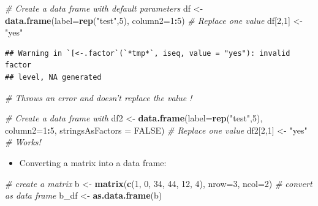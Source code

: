 \documentclass[]{book}
\newenvironment{Shaded}{\begin{snugshade}}{\end{snugshade}}
\newcommand{\CommentTok}[1]{\textcolor[rgb]{0.56,0.35,0.01}{\textit{#1}}}
\newcommand{\DataTypeTok}[1]{\textcolor[rgb]{0.13,0.29,0.53}{#1}}
\newcommand{\DecValTok}[1]{\textcolor[rgb]{0.00,0.00,0.81}{#1}}
\newcommand{\KeywordTok}[1]{\textcolor[rgb]{0.13,0.29,0.53}{\textbf{#1}}}
\newcommand{\NormalTok}[1]{#1}
\newcommand{\OperatorTok}[1]{\textcolor[rgb]{0.81,0.36,0.00}{\textbf{#1}}}
\newcommand{\OtherTok}[1]{\textcolor[rgb]{0.56,0.35,0.01}{#1}}
\newcommand{\StringTok}[1]{\textcolor[rgb]{0.31,0.60,0.02}{#1}}
\providecommand{\tightlist}{%
  \setlength{\itemsep}{0pt}\setlength{\parskip}{0pt}}
\begin{document}
\begin{Shaded}
\begin{Highlighting}[]
\CommentTok{# Create a data frame with default parameters}
\NormalTok{df <-}\StringTok{ }\KeywordTok{data.frame}\NormalTok{(}\DataTypeTok{label=}\KeywordTok{rep}\NormalTok{(}\StringTok{"test"}\NormalTok{,}\DecValTok{5}\NormalTok{), }\DataTypeTok{column2=}\DecValTok{1}\OperatorTok{:}\DecValTok{5}\NormalTok{)}
\CommentTok{# Replace one value}
\NormalTok{df[}\DecValTok{2}\NormalTok{,}\DecValTok{1}\NormalTok{] <-}\StringTok{ "yes"}
\end{Highlighting}
\end{Shaded}

\begin{verbatim}
## Warning in `[<-.factor`(`*tmp*`, iseq, value = "yes"): invalid factor
## level, NA generated
\end{verbatim}

\begin{Shaded}
\begin{Highlighting}[]
\CommentTok{# Throws an error and doesn't replace the value !}
\end{Highlighting}
\end{Shaded}

\begin{Shaded}
\begin{Highlighting}[]
\CommentTok{# Create a data frame with }
\NormalTok{df2 <-}\StringTok{ }\KeywordTok{data.frame}\NormalTok{(}\DataTypeTok{label=}\KeywordTok{rep}\NormalTok{(}\StringTok{"test"}\NormalTok{,}\DecValTok{5}\NormalTok{), }\DataTypeTok{column2=}\DecValTok{1}\OperatorTok{:}\DecValTok{5}\NormalTok{, }\DataTypeTok{stringsAsFactors =} \OtherTok{FALSE}\NormalTok{)}
\CommentTok{# Replace one value}
\NormalTok{df2[}\DecValTok{2}\NormalTok{,}\DecValTok{1}\NormalTok{] <-}\StringTok{ "yes"}
\CommentTok{# Works!}
\end{Highlighting}
\end{Shaded}

\begin{itemize}
\tightlist
\item
  Converting a matrix into a data frame:
\end{itemize}

\begin{Shaded}
\begin{Highlighting}[]
\CommentTok{# create a matrix}
\NormalTok{b <-}\StringTok{ }\KeywordTok{matrix}\NormalTok{(}\KeywordTok{c}\NormalTok{(}\DecValTok{1}\NormalTok{, }\DecValTok{0}\NormalTok{, }\DecValTok{34}\NormalTok{, }\DecValTok{44}\NormalTok{, }\DecValTok{12}\NormalTok{, }\DecValTok{4}\NormalTok{), }
        \DataTypeTok{nrow=}\DecValTok{3}\NormalTok{,}
        \DataTypeTok{ncol=}\DecValTok{2}\NormalTok{)}
\CommentTok{# convert as data frame}
\NormalTok{b_df <-}\StringTok{ }\KeywordTok{as.data.frame}\NormalTok{(b)}
\end{Highlighting}
\end{Shaded}
\end{document}
